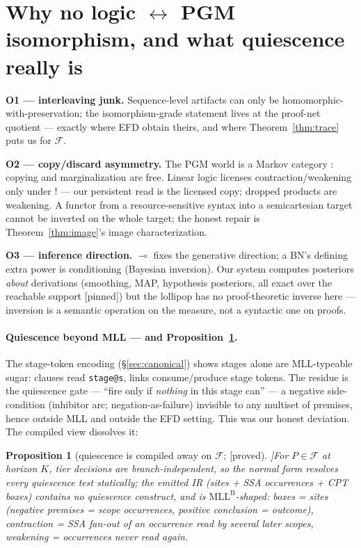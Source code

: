 \documentclass[11pt]{article}
\newcommand{\lolli}{\multimap}
\newcommand{\bang}{\mathord{!}}
\newcommand{\mllb}{\mathrm{MLL}^{\mathrm B}}
\newcommand{\cclass}{\mathcal{F}}                  %
\newcommand{\stproved}{[\textsf{proved}]}
\newcommand{\stpinned}{[\textsf{pinned}]}
\theoremstyle{plain}
\newtheorem{proposition}[theorem]{Proposition}
\theoremstyle{definition}
\theoremstyle{remark}
\begin{document}
\section{Why no logic \texorpdfstring{$\leftrightarrow$}{<->} PGM
isomorphism, and what quiescence really is}\label{sec:obstructions}

\textbf{O1 --- interleaving junk.} Sequence-level artifacts can only be
homomorphic-with-preservation; the isomorphism-grade statement lives at
the proof-net quotient --- exactly where EFD obtain theirs, and where
Theorem~\ref{thm:trace} puts us for $\cclass$.

\textbf{O2 --- copy/discard asymmetry.} The PGM world is a Markov
category \cite{Fri20,CJ19}: copying and marginalization are free.
Linear logic licenses contraction/weakening only under $\bang$ --- our
persistent read is the licensed copy; dropped products are weakening. A
functor from a resource-sensitive syntax into a semicartesian target
cannot be inverted on the whole target; the honest repair is
Theorem~\ref{thm:image}'s image characterization.

\textbf{O3 --- inference direction.} $\lolli$ fixes the generative
direction; a BN's defining extra power is conditioning (Bayesian
inversion). Our system computes posteriors \emph{about} derivations
(smoothing, MAP, hypothesis posteriors, all exact over the reachable
support \stpinned{}) but the lollipop has no proof-theoretic inverse
here --- inversion is a semantic operation on the measure, not a
syntactic one on proofs.

\paragraph{Quiescence beyond MLL --- and
Proposition~\ref{prop:quiescence}.} The stage-token encoding
(\S\ref{sec:canonical}) shows stages alone are MLL-typeable sugar:
clauses read \texttt{stage@s}, links consume/produce stage tokens. The
residue is the quiescence gate --- ``fire only if \emph{nothing} in
this stage can'' --- a negative side-condition (inhibitor arc;
negation-as-failure) invisible to any multiset of premises, hence
outside MLL and outside the EFD setting. This was our honest deviation.
The compiled view dissolves it:

\begin{proposition}[quiescence is compiled away on $\cclass$;
\stproved{}]\label{prop:quiescence}
For $P \in \cclass$ at horizon $K$, tier decisions are
branch-independent, so the normal form resolves every quiescence test
statically; the emitted IR (sites + SSA occurrences + CPT boxes)
contains no quiescence construct, and is $\mllb$-shaped: boxes = sites
(negative premises = scope occurrences, positive conclusion = outcome),
contraction = SSA fan-out of an occurrence read by several later
scopes, weakening = occurrences never read again.
\end{proposition}
\end{document}
